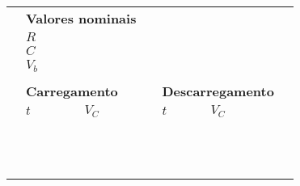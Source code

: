 \begin{table*}
	\begin{center}
		\begin{tabular}{lp{25mm}p{25mm}lp{25mm}p{25mm}l}
		\toprule
		& \multicolumn{2}{l}{\textbf{Valores nominais}} \\
		\cmidrule{2-3}
		& $R$ \cellcolor[gray]{0.89} & \cellcolor[gray]{0.92} \\
		& $C$ \cellcolor[gray]{0.95} & \cellcolor[gray]{0.97} \\
		& $V_b$ \cellcolor[gray]{0.89} & \cellcolor[gray]{0.92} \\
		\cmidrule{2-3}
\\
		& \multicolumn{2}{l}{\textbf{Carregamento}} & & \multicolumn{2}{l}{\textbf{Descarregamento}} \\
		\cmidrule{2-3} \cmidrule{5-6}
		& $t$ & $V_C$ & & $t$ & $V_C$ \\
		\cmidrule{2-3} \cmidrule{5-6}
		& \cellcolor[gray]{0.89} & \cellcolor[gray]{0.92} & & \cellcolor[gray]{0.89} & \cellcolor[gray]{0.92} & \\
		& \cellcolor[gray]{0.95} & \cellcolor[gray]{0.97} & & \cellcolor[gray]{0.95} & \cellcolor[gray]{0.97} & \\
		& \cellcolor[gray]{0.89} & \cellcolor[gray]{0.92} & & \cellcolor[gray]{0.89} & \cellcolor[gray]{0.92} & \\
		& \cellcolor[gray]{0.95} & \cellcolor[gray]{0.97} & & \cellcolor[gray]{0.95} & \cellcolor[gray]{0.97} & \\
		& \cellcolor[gray]{0.89} & \cellcolor[gray]{0.92} & & \cellcolor[gray]{0.89} & \cellcolor[gray]{0.92} & \\
		& \cellcolor[gray]{0.95} & \cellcolor[gray]{0.97} & & \cellcolor[gray]{0.95} & \cellcolor[gray]{0.97} & \\
		& \cellcolor[gray]{0.89} & \cellcolor[gray]{0.92} & & \cellcolor[gray]{0.89} & \cellcolor[gray]{0.92} & \\
		& \cellcolor[gray]{0.95} & \cellcolor[gray]{0.97} & & \cellcolor[gray]{0.95} & \cellcolor[gray]{0.97} & \\
		& \cellcolor[gray]{0.89} & \cellcolor[gray]{0.92} & & \cellcolor[gray]{0.89} & \cellcolor[gray]{0.92} & \\
		& \cellcolor[gray]{0.95} & \cellcolor[gray]{0.97} & & \cellcolor[gray]{0.95} & \cellcolor[gray]{0.97} & \\
		& \cellcolor[gray]{0.89} & \cellcolor[gray]{0.92} & & \cellcolor[gray]{0.89} & \cellcolor[gray]{0.92} & \\
		& \cellcolor[gray]{0.95} & \cellcolor[gray]{0.97} & & \cellcolor[gray]{0.95} & \cellcolor[gray]{0.97} & \\

\end{tabular}
\end{center}
\end{table*}
